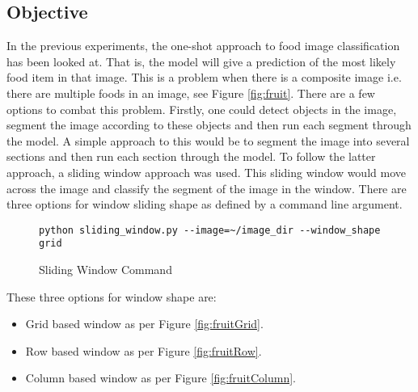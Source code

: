 \tocless\subsection{Objective}
In the previous experiments, the one-shot approach to food image
classification has been looked at. That is, the model will give a prediction of the most likely
food item in that image. This is a problem when there is a composite image i.e. there are multiple foods in an
image, see Figure \ref{fig:fruit}. There are a few options to combat this problem. Firstly, one could detect
objects in the image, segment the image according to these objects and then run
each segment through the model.
A simple approach to this would be to segment
the image into several sections and then run each section through the model.
To follow the latter approach, a sliding window approach was used. This
sliding window would move across the image and classify the segment of the image
in the window. There are three options for window sliding shape as defined by a
command line argument.

\begin{figure}
\caption{Sliding Window Command}
\label{lst:slidingWindowCommand}
\begin{lstlisting}[style=Command]
python sliding_window.py --image=~/image_dir --window_shape grid
\end{lstlisting}
\end{figure}

These three options for window shape are:
\begin{itemize}
	\item{Grid based window as per Figure \ref{fig:fruitGrid}}.
	\item{Row based window as per Figure \ref{fig:fruitRow}}.
	\item{Column based window as per Figure \ref{fig:fruitColumn}}.
\end{itemize}

